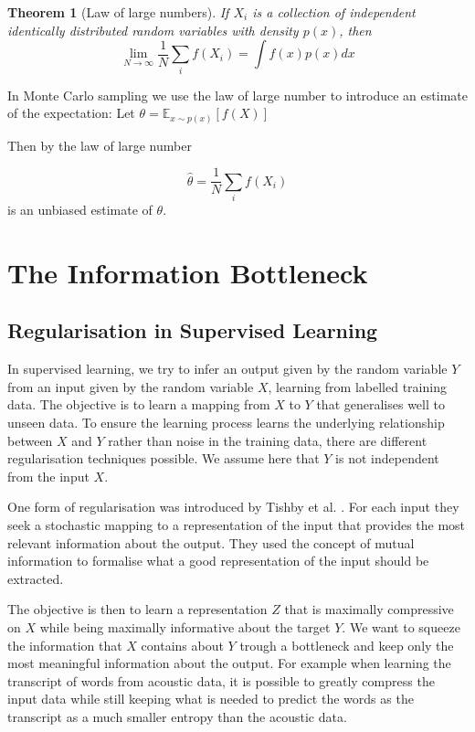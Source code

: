 \documentclass[11pt,oneside,openright]{report}
\newtheorem{theorem}{Theorem}
\begin{document}
\begin{theorem}[Law of large numbers]
If $X_i$ is a collection of independent identically distributed random variables with density $p(x)$, then
$$ \lim_{N \to \infty} \frac{1}{N} \sum_i f(X_i) = \int f(x) p(x) dx $$
\end{theorem}

In Monte Carlo sampling we use the law of large number to introduce an estimate  of the expectation:
Let $\theta = \mathbb{E}_{x \sim p(x)}[f(X)]$

Then by the law of large number 

$$ \hat{\theta} =  \frac{1}{N} \sum_i f(X_i) $$ is an unbiased estimate of $\theta$.

\section{The Information Bottleneck}
\subsection{Regularisation in Supervised Learning}
In supervised learning, we try to infer an output given by the random variable $Y$ from an input given by the random variable $X$, learning from labelled training data. The objective is to learn a mapping from $X$ to $Y$ that generalises well to unseen data. To ensure the learning process learns the underlying relationship between $X$ and $Y$ rather than noise in the training data, there are different regularisation techniques possible. We assume here that $Y$ is not independent from the input $X$.

One form of regularisation was introduced by Tishby et al. \cite{tishby}. For each input they seek a stochastic mapping to a representation of the input that provides the most relevant information about the output. They used the concept of mutual information to formalise what a good representation of the input should be extracted. 

The objective is then to learn a representation $Z$ that is maximally compressive on $X$ while being maximally informative about the target $Y$. We want to squeeze the information that $X$ contains about $Y$ trough a bottleneck and keep only the most meaningful information about the output. For example when learning the transcript of words from acoustic data, it is possible to greatly compress the input data while still keeping what is needed to predict the words as the transcript as a much smaller entropy than the acoustic data.
\end{document}
